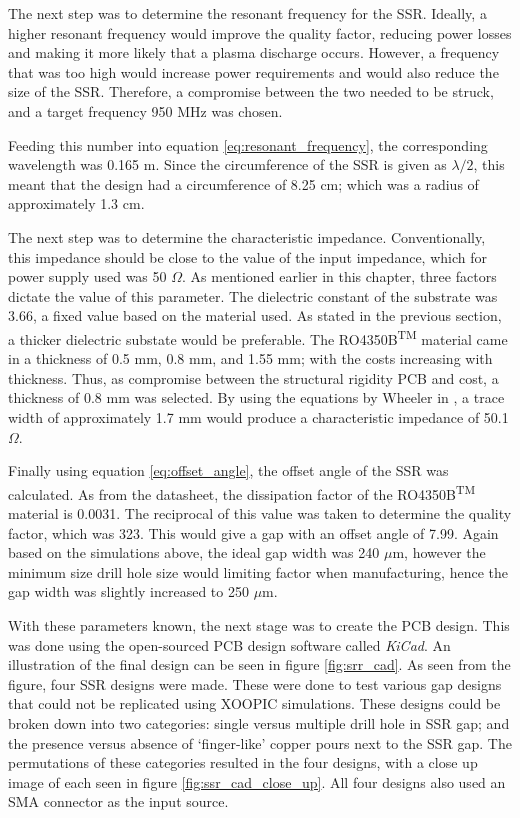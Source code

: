 The next step was to determine the resonant frequency for the SSR. Ideally, a higher resonant frequency would improve the quality factor, reducing power losses and making it more likely that a plasma discharge occurs. However, a frequency that was too high would increase power requirements and would also reduce the size of the SSR. Therefore, a compromise between the two needed to be struck, and a target frequency 950 MHz was chosen. 

Feeding this number into equation \ref{eq:resonant_frequency}, the corresponding wavelength was 0.165 m. Since the circumference of the SSR is given as $\lambda/2$, this meant that the design had a circumference of 8.25 cm; which was a radius of approximately 1.3 cm. 

The next step was to determine the characteristic impedance. Conventionally, this impedance should be close to the value of the input impedance, which for power supply used was 50 $\Omega$. As mentioned earlier in this chapter, three factors dictate the value of this parameter. The dielectric constant of the substrate was 3.66, a fixed value based on the material used. As stated in the previous section, a thicker dielectric substate would be preferable. The RO4350B\textsuperscript{TM} material came in a thickness of 0.5 mm, 0.8 mm, and 1.55 mm; with the costs increasing with thickness. Thus, as compromise between the structural rigidity PCB and cost, a thickness of 0.8 mm was selected. By using the equations by Wheeler in \cite{wheeler_1977}, a trace width of approximately 1.7 mm would produce a characteristic impedance of 50.1 $\Omega$.

Finally using equation \ref{eq:offset_angle}, the offset angle of the SSR was calculated. As from the datasheet, the dissipation factor of the RO4350B\textsuperscript{TM} material is 0.0031. The reciprocal of this value was taken to determine the quality factor, which was 323. This would give a gap with an offset angle of 7.99. Again based on the simulations above, the ideal gap width was 240 $\mu$m, however the minimum size drill hole size would limiting factor when manufacturing, hence the gap width was slightly increased to 250 $\mu$m.

With these parameters known, the next stage was to create the PCB design. This was done using the open-sourced PCB design software called \textit{KiCad}. An illustration of the final design can be seen in figure \ref{fig:srr_cad}. As seen from the figure, four SSR designs were made. These were done to test various gap designs that could not be replicated using XOOPIC simulations. These designs could be broken down into two categories: single versus multiple drill hole in SSR gap; and the presence versus absence of `finger-like' copper pours next to the SSR gap. The permutations of these categories resulted in the four designs, with a close up image of each seen in figure \ref{fig:ssr_cad_close_up}. All four designs also used an SMA connector as the input source. 

